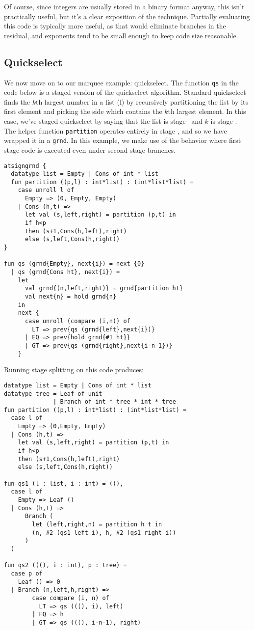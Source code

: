 Of course, since integers are usually stored in a binary format anyway, 
this isn't practically useful, but it's a clear exposition of the technique.
Partially evaluating this code is typically more useful,
as that would eliminate branches in the residual,
and exponents tend to be small enough to keep code size reasonable.

\subsection{Quickselect}

We now move on to our marquee example: quickselect.
The function {\tt qs} in the code below is a staged version of the quickselect algorithm.
Standard quickselect finds the $k$th largest number in a list (l) by recursively partitioning the list by its 
first element and picking the side which contains the $k$th largest element.
In this case, we've staged quickselect by saying that the list is stage \bbone\ and $k$ is stage \bbtwo.
The helper function {\tt partition} operates entirely in stage \bbone, and so we have wrapped it in a \texttt{grnd}.
In this example, we make use of the behavior where first stage code is executed even under second stage branches.

\begin{lstlisting} 
atsigngrnd { 
  datatype list = Empty | Cons of int * list
  fun partition ((p,l) : int*list) : (int*list*list) = 
    case unroll l of 
      Empty => (0, Empty, Empty) 
    | Cons (h,t) => 
      let val (s,left,right) = partition (p,t) in 
      if h<p 
      then (s+1,Cons(h,left),right) 
      else (s,left,Cons(h,right))
}

fun qs (grnd{Empty}, next{i}) = next {0} 
  | qs (grnd{Cons ht}, next{i}) =
    let 
      val grnd{(n,left,right)} = grnd{partition ht}
      val next{n} = hold grnd{n}
    in
    next { 
      case unroll (compare (i,n)) of
        LT => prev{qs (grnd{left},next{i})}
      | EQ => prev{hold grnd{#1 ht}}
      | GT => prev{qs (grnd{right},next{i-n-1})}
    }
\end{lstlisting}
Running stage splitting on this code produces:
\begin{lstlisting} 
datatype list = Empty | Cons of int * list
datatype tree = Leaf of unit 
              | Branch of int * tree * int * tree
fun partition ((p,l) : int*list) : (int*list*list) = 
  case l of 
    Empty => (0,Empty, Empty) 
  | Cons (h,t) => 
    let val (s,left,right) = partition (p,t) in 
    if h<p 
    then (s+1,Cons(h,left),right) 
    else (s,left,Cons(h,right))

fun qs1 (l : list, i : int) = ((), 
  case l of
    Empty => Leaf ()
  | Cons (h,t) => 
      Branch (
        let (left,right,n) = partition h t in
        (n, #2 (qs1 left i), h, #2 (qs1 right i))
      )
  )

fun qs2 (((), i : int), p : tree) = 
  case p of
    Leaf () => 0
  | Branch (n,left,h,right) =>
        case compare (i, n) of 
          LT => qs (((), i), left) 
        | EQ => h 
        | GT => qs (((), i-n-1), right)

\end{lstlisting}

